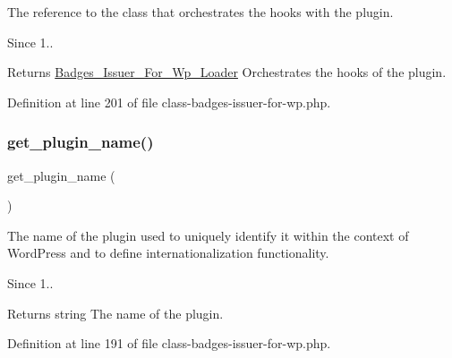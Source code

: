 The reference to the class that orchestrates the hooks with the plugin.

\begin{DoxySince}{Since}
1.. 
\end{DoxySince}
\begin{DoxyReturn}{Returns}
\hyperlink{class_badges___issuer___for___wp___loader}{Badges\+\_\+\+Issuer\+\_\+\+For\+\_\+\+Wp\+\_\+\+Loader} Orchestrates the hooks of the plugin. 
\end{DoxyReturn}


Definition at line 201 of file class-\/badges-\/issuer-\/for-\/wp.\+php.

\mbox{\label{class_badges___issuer___for___wp_ac167594092be2e67466f12eabdf6fc52}} 
\subsubsection{\texorpdfstring{get\+\_\+plugin\+\_\+name()}{get\_plugin\_name()}}
{\footnotesize\ttfamily get\+\_\+plugin\+\_\+name (\begin{DoxyParamCaption}{ }\end{DoxyParamCaption})}

The name of the plugin used to uniquely identify it within the context of Word\+Press and to define internationalization functionality.

\begin{DoxySince}{Since}
1.. 
\end{DoxySince}
\begin{DoxyReturn}{Returns}
string The name of the plugin. 
\end{DoxyReturn}


Definition at line 191 of file class-\/badges-\/issuer-\/for-\/wp.\+php.

\mbox{\label{class_badges___issuer___for___wp_a5724f2c1a8d9303e139195c3354af02a}} 
